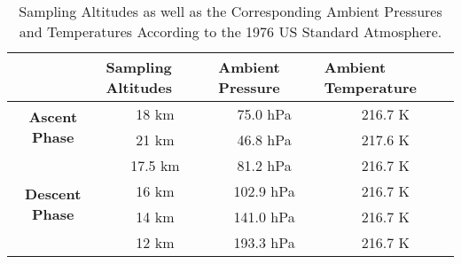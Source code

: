 \begin{table}[H]
\centering
\begin{tabular}{|c|c|c|c|}
\hline
\multicolumn{1}{|l|}{} & \multicolumn{1}{l|}{\textbf{Sampling Altitudes}} & \multicolumn{1}{l|}{\textbf{Ambient Pressure}} & \multicolumn{1}{l|}{\textbf{Ambient Temperature}} \\ \hline
\multirow{2}{*}{\textbf{Ascent Phase}} & 18 km & 75.0 hPa & 216.7 K \\ \cline{2-4} 
 & 21 km & 46.8 hPa & 217.6 K \\ \hline
\multirow{4}{*}{\textbf{Descent Phase}} & 17.5 km & 81.2 hPa & 216.7 K \\ \cline{2-4} 
 & 16 km & 102.9 hPa & 216.7 K \\ \cline{2-4} 
 & 14 km & 141.0 hPa & 216.7 K \\ \cline{2-4} 
 & 12 km & 193.3 hPa & 216.7 K \\ \hline
\end{tabular}
\caption{Sampling Altitudes as well as the Corresponding Ambient Pressures and Temperatures According to the 1976 US Standard Atmosphere.}
\label{tab:sampling-altitudes}
\end{table}